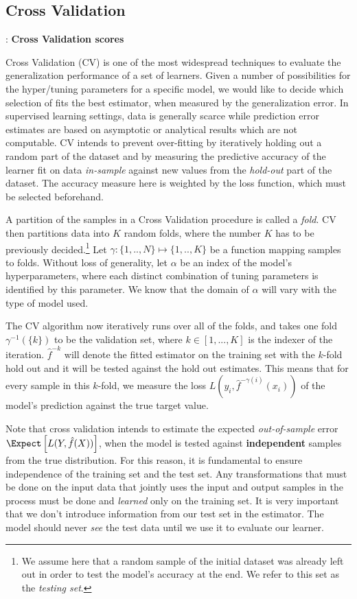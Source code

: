 \subsection{Cross Validation}:  
\textbf{Cross Validation scores}

Cross Validation (CV) is one of the most widespread techniques to evaluate the generalization performance of a set of learners. Given a number of possibilities for the hyper/tuning parameters for a specific model, we would like to decide which selection of fits the best estimator, when measured by the generalization error. In supervised learning settings, data is generally scarce while prediction error estimates are based on asymptotic or analytical results which are not computable. CV intends to prevent over-fitting by iteratively holding out a random part of the dataset and by measuring the predictive accuracy of the learner fit on data \textit{in-sample} against new values from the \textit{hold-out} part of the dataset. The accuracy measure here is weighted by the loss function, which must be selected beforehand. 
 
 A partition of the samples in a Cross Validation procedure is called a \textit{fold}. CV then partitions data into $K$ random folds, where the number $K$ has to be previously decided.\footnote{ We assume here that a random sample of the initial dataset was already left out in order to test the model's accuracy at the end. We refer to this set as the \textit{testing set}.} Let $\gamma : \{1,..,N\} \mapsto \{1, .., K\}$ be a function mapping samples to folds. Without loss of generality,  let $\alpha$ be an index of the model's hyperparameters, where each distinct combination of tuning parameters is identified by this parameter. We know that the domain of $\alpha$ will vary with the type of model used. 
 
 The CV algorithm now iteratively runs over all of the folds, and takes one fold $\gamma^{-1}(\{k\})$ to be the validation set, where $k \in [1,...,K]$ is the indexer of the iteration. $\hat{f}^{-k}$ will denote the fitted estimator on the training set with the $k$-fold hold out and it will be tested against the hold out estimates. This means that for every sample in this $k$-fold, we measure the loss $L(y_i, \hat{f}^{-\gamma(i)}(x_i))$ of the model's prediction against the true target value.
 
 Note that cross validation intends to estimate the expected \textit{out-of-sample} error $\Expect \left[  L(Y, \hat{f}(X)) \right]$, when the model is tested against \textbf{independent} samples from the true distribution. For this reason, it is fundamental to ensure independence of the training set and the test set. Any transformations that must be done on the input data that jointly uses the input and output samples in the process must be done and \textit{learned} only on the training set. It is very important that we don't introduce information from our test set in the estimator. The model should never \textit{see} the test data until we use it to evaluate our learner. 
 
